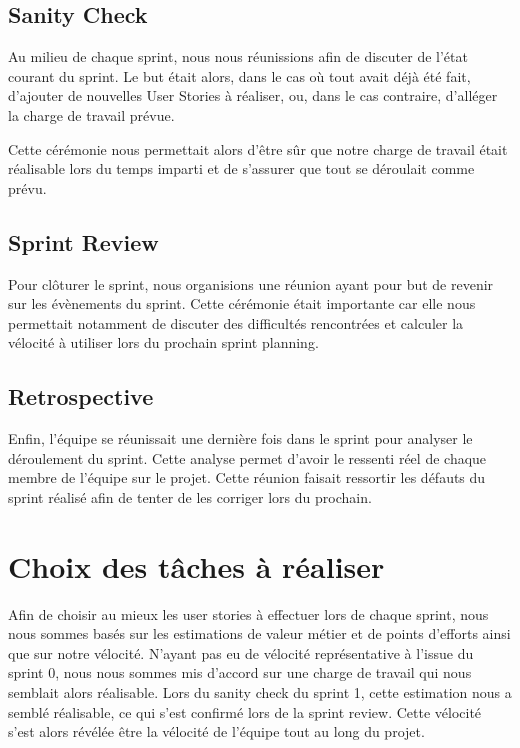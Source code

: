 \documentclass[11pt]{report}
\begin{document}
\subsection{Sanity Check}

Au milieu de chaque sprint, nous nous réunissions afin de discuter de l'état courant du sprint. Le but était alors, dans le cas
où tout avait déjà été fait, d'ajouter de nouvelles User Stories à réaliser, ou, dans le cas contraire, d'alléger la charge
de travail prévue.

Cette cérémonie nous permettait alors d'être sûr que notre charge de travail était réalisable lors du temps imparti
et de s'assurer que tout se déroulait comme prévu.

\subsection{Sprint Review}

Pour clôturer le sprint, nous organisions une réunion ayant pour but de revenir sur les évènements du sprint.
Cette cérémonie était importante car elle nous permettait notamment de discuter des difficultés rencontrées et calculer la vélocité 
à utiliser lors du prochain sprint planning.

\subsection{Retrospective}

Enfin, l'équipe se réunissait une dernière fois dans le sprint pour analyser le déroulement du sprint. Cette analyse permet d'avoir le ressenti réel de chaque membre de l'équipe sur le projet. Cette réunion faisait ressortir les défauts du sprint réalisé afin de tenter de les corriger lors du prochain.

\section{Choix des tâches à réaliser}

Afin de choisir au mieux les user stories à effectuer lors de chaque sprint, nous nous sommes basés sur les estimations de valeur métier et de points d'efforts ainsi que sur notre vélocité. N'ayant pas eu de vélocité représentative à l'issue du sprint 0, nous nous sommes mis d'accord sur une charge de travail qui nous semblait alors réalisable. Lors du sanity check du sprint 1, cette estimation nous a semblé réalisable, ce qui s'est confirmé lors de la sprint review. Cette vélocité s'est alors révélée être la vélocité de l'équipe tout au long du projet.\newline
\end{document}
